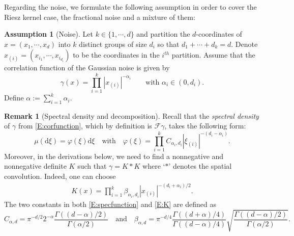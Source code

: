 \documentclass[12pt]{report}
\theoremstyle{plain}
\theoremstyle{definition}
\newtheorem{assumption}[theorem]{Assumption}
\newtheorem{remark}[theorem]{Remark}
\numberwithin{equation}{section}
\newcommand{\ud}{\ensuremath{ \mathrm{d} }}
\begin{document}
Regarding the noise, we formulate the following assumption in order to cover the Riesz kernel case,
the fractional noise and a mixture of them:
\begin{assumption}[Noise] \label{A:Noise}
	Let $k \in \{1, \cdots , d\}$ and partition the $d$-coordinates of $x=(x_1, \cdots, x_d)$ into $k$
	distinct groups of size $d_i$ so that $d_1 + \cdots + d_k = d$. Denote $x_{(i)} = (x_{i_1} ,
	\cdots , x_{i_{d_i}})$ to be the coordinates in the $i^{th}$ partition. Assume that the
	correlation function of the Gaussian noise is given by
	\begin{equation}
	\label{E:corfunction}
	\gamma(x) = \prod_{i=1}^k \left|x_{(i)}\right|^{-\alpha_i} \qquad \text{with $\alpha_i \in (0, d_i)$.}
	\end{equation}
	Define $\alpha := \sum_{i=1}^k \alpha_i$.
\end{assumption}

\begin{remark}[Spectral density and decomposition] \label{R:Noise}
	Recall that the {\it spectral density} of $\gamma$ from \eqref{E:corfunction}, which by definition is
	$\mathcal{F}\gamma$, takes the following form:
	\begin{equation}
	\label{E:specfunction}
	\mu (\ud \xi) = \varphi(\xi) \ud \xi \quad \text{with} \quad
	\varphi(\xi) = \prod_{i=1}^k C_{\alpha_i,d_i} |\xi_{(i)}|^{-(d_i-\alpha_i)}.
	\end{equation}
	Moreover, in the derivations below, we need to find a nonnegative and nonnegative definite $K$
	such that $\gamma = K*K$ where `$*$' denotes the spatial convolution. Indeed, one can choose
	\begin{align}
	\label{E:K}
	K(x) =\prod_{i=1}^k \beta_{\alpha_i,d_i} \left|x_{(i)}\right|^{-(d_i+\alpha_i)/2}.
	\end{align}
	The two constants in both \eqref{E:specfunction} and \eqref{E:K} are defined as
	\begin{equation}
	\label{E:noiseconstant}
	C_{\alpha,d}     = \pi^{-d/2}2^{-\alpha} \frac{\Gamma((d-\alpha)/2)}{\Gamma(\alpha/2)} \quad \text{and}\quad
	\beta_{\alpha,d} = \pi^{-d/4}\frac{\Gamma((d+\alpha)/4)}{\Gamma((d-\alpha)/4)}\sqrt{ \frac{\Gamma((d-\alpha)/2)}{\Gamma(\alpha/2)}}.
	\end{equation}
\end{remark}
\end{document}
